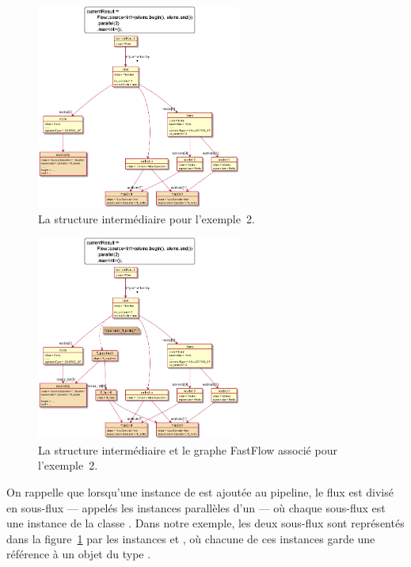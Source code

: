 \begin{figure}
\centering
         \includegraphics[width=0.6\textwidth]{Figures/objets2-ppff.png}
      \caption{La structure interm\'ediaire  pour l'exemple~2.}
       \label{objets2-ppff.fig}
\end{figure}

\begin{figure}
\centering
         \includegraphics[width=0.6\textwidth]{Figures/objets2-ff.png}
      \caption{La structure interm\'ediaire  et le graphe FastFlow associ\'e pour l'exemple~2.}
       \label{objets2-ff.fig}

\end{figure}



On rappelle que lorsqu'une instance de  est ajout\'ee au {pipeline}, le flux est divis\'e en sous-flux --- appel\'es les instances parall\`eles d'un  --- o\`u chaque sous-flux est une instance de la classe . Dans notre exemple, les deux sous-flux sont représent\'es dans la figure~\ref{objets2-ppff.fig} par les instances  et , o\`u chacune de ces instances garde une r\'ef\'erence \`a un objet du type . 

